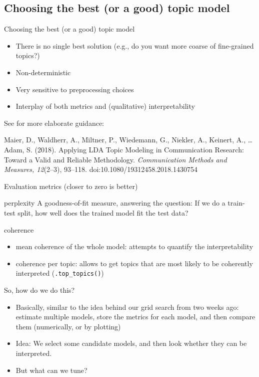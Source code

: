 \documentclass[compress]{beamer}
\begin{document}
\subsection{Choosing the best (or a good) topic model}

\begin{frame}{Choosing the best (or a good) topic model}
	\begin{itemize}
		\item There is no single best solution (e.g., do you want more coarse of fine-grained topics?)
		\item Non-deterministic
		\item Very sensitive to preprocessing choices
		\item Interplay of both metrics and (qualitative) interpretability 
	\end{itemize}
	
	See for more elaborate guidance:
	
	\tiny{Maier, D., Waldherr, A., Miltner, P., Wiedemann, G., Niekler, A., Keinert, A., \ldots Adam, S. (2018). Applying LDA Topic Modeling in Communication Research: Toward a Valid and Reliable Methodology. \textit{Communication Methods and Measures, 12}(2--3), 93--118. doi:10.1080/19312458.2018.1430754}
	
\end{frame}



\begin{frame}{Evaluation metrics (closer to zero is better)}
	\begin{block}{perplexity}
		A goodness-of-fit measure, answering the question: If we do a train-test split, how well does the trained model fit the test data?
	\end{block}
	
	\pause 
	\begin{block}{coherence}
		\begin{itemize}
			\item mean coherence of the whole model: attempts to quantify the interpretability
			\item coherence per topic: allows to get topics that are most likely to be coherently interpreted (\texttt{.top\_topics()})
		\end{itemize}
	\end{block}
	
\end{frame}


\begin{frame}{So, how do we do this?}
	\begin{itemize}[<+->]
		\item Basically, similar to the idea behind our grid search from two weeks ago: estimate multiple models, store the metrics for each model, and then compare them (numerically, or by plotting)
		\item Idea: We select some candidate models, and then look whether they can be interpreted.
		\item But what can we tune?
	\end{itemize}
\end{frame}
\end{document}
